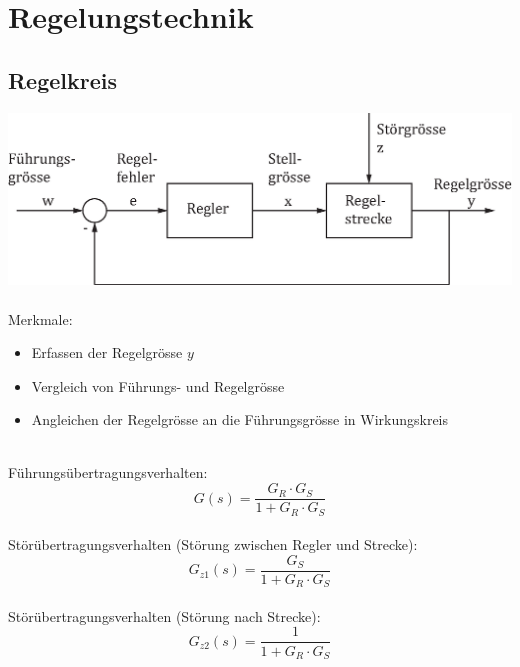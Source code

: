 



\chapter{Regelungstechnik}

\section{Regelkreis}
\includegraphics[width = \linewidth]{../fig/regelkreis.eps}
\\\\
Merkmale:
\begin{itemize}
	\item Erfassen der Regelgrösse $y$
	\item Vergleich von Führungs- und Regelgrösse
	\item Angleichen der Regelgrösse an die Führungsgrösse in Wirkungskreis
\end{itemize}
~\\
Führungsübertragungsverhalten:
\[
	G(s) = \frac{G_R \cdot G_S}{1 + G_R \cdot G_S}
\]
~\\
Störübertragungsverhalten (Störung zwischen Regler und Strecke):
\[
	G_{z1}(s) =\frac{G_S}{1 + G_R \cdot G_S}
\]
~\\
Störübertragungsverhalten (Störung nach Strecke):
\[
	G_{z2}(s) = \frac{1}{1 + G_R \cdot G_S}
\]

